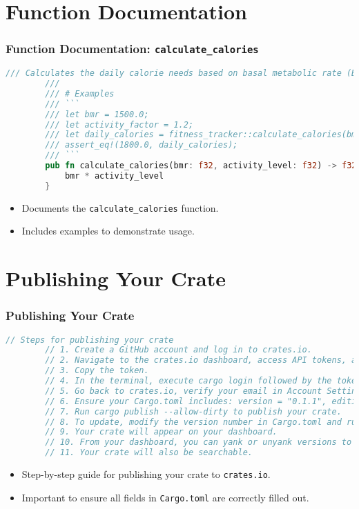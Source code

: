 \documentclass[aspectratio=169, table]{beamer}
\begin{document}
\section{Function Documentation}
\begin{frame}[fragile]
	\frametitle{Function Documentation: \texttt{calculate\_calories}}
	\begin{lstlisting}[language=Rust]
		/// Calculates the daily calorie needs based on basal metabolic rate (BMR) and activity level
		/// 
		/// # Examples
		/// ``` 
		/// let bmr = 1500.0;
		/// let activity_factor = 1.2;
		/// let daily_calories = fitness_tracker::calculate_calories(bmr, activity_factor);
		/// assert_eq!(1800.0, daily_calories); 
		/// ```  
		pub fn calculate_calories(bmr: f32, activity_level: f32) -> f32 {
			bmr * activity_level
		}
	\end{lstlisting}
	\begin{itemize}
		\item Documents the \texttt{calculate\_calories} function.
		\item Includes examples to demonstrate usage.
	\end{itemize}
\end{frame}

\section{Publishing Your Crate}
\begin{frame}[fragile]
	\frametitle{Publishing Your Crate}
	\begin{lstlisting}[language=Rust]
		// Steps for publishing your crate
		// 1. Create a GitHub account and log in to crates.io.
		// 2. Navigate to the crates.io dashboard, access API tokens, and create a new token.
		// 3. Copy the token.
		// 4. In the terminal, execute cargo login followed by the token from crates.io.
		// 5. Go back to crates.io, verify your email in Account Settings -> Profile -> Email -> Save.
		// 6. Ensure your Cargo.toml includes: version = "0.1.1", edition = "2021", authors = ["Your Name"], description = "Fitness calculation utilities", license = "MIT".
		// 7. Run cargo publish --allow-dirty to publish your crate.
		// 8. To update, modify the version number in Cargo.toml and run the publish command again.
		// 9. Your crate will appear on your dashboard.
		// 10. From your dashboard, you can yank or unyank versions to control downloads.
		// 11. Your crate will also be searchable.
	\end{lstlisting}
	\begin{itemize}
		\item Step-by-step guide for publishing your crate to \texttt{crates.io}.
		\item Important to ensure all fields in \texttt{Cargo.toml} are correctly filled out.
	\end{itemize}
\end{frame}
\end{document}
